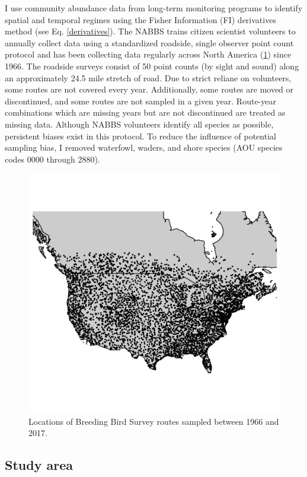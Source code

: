 \documentclass[12pt,twoside,openany]{reedthesis}
\begin{document}
I use community abundance data from long-term monitoring programs to identify spatial and temporal regimes using the Fisher Information (FI) derivatives method (see Eq. \ref{derivatives}). The NABBS trains citizen scientist volunteers to annually collect data using a standardized roadside, single observer point count protocol and has been collecting data regularly across North America (\ref{fig:bbsPoints}) since 1966. The roadside surveys consist of 50 point counts (by sight and sound) along an approximately 24.5 mile stretch of road. Due to strict reliane on volunteers, some routes are not covered every year. Additionally, some routes are moved or discontinued, and some routes are not sampled in a given year. Route-year combinations which are missing years but are not discontinued are treated as missing data. Although NABBS volunteers identify all species as possible, persistent biases exist in this protocol. To reduce the influence of potential sampling bias, I removed waterfowl, waders, and shore species (AOU species codes 0000 through 2880).
\begin{figure}
\includegraphics[width=0.85\linewidth]{./chapterFiles/fisherSpatial/figures/figsCalledInDiss/bbsRoutesUsed} \caption{Locations of Breeding Bird Survey routes sampled between 1966 and 2017.}\label{fig:bbsPoints}
\end{figure}
\hypertarget{study-area}{%
\subsection{Study area}\label{study-area}}
\end{document}
